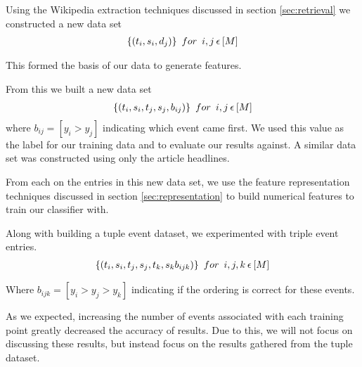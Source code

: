 \documentclass[bsc,frontabs,twoside,singlespacing,parskip,deptreport]{infthesis}     %
\begin{document}
    Using the Wikipedia extraction techniques discussed in section \ref{sec:retrieval} we constructed a new data set
    \begin{eqnarray}
      \{(t_{i},s_{i},d_{j})\} \hspace{0.5em} for \hspace{0.5em}i,j  \hspace{0.2em}\epsilon \hspace{0.2em}[M]\nonumber
    \end{eqnarray}
    
    This formed the basis of our data to generate features.

    From this we built a new data set
    \begin{eqnarray}
      \{(t_{i},s_{i},t_{j},s_{j},b_{ij})\} \hspace{0.5em} for \hspace{0.5em} i,j \hspace{0.2em}\epsilon \hspace{0.2em}[M]\nonumber
    \end{eqnarray}
    where $b_{ij} = [y_{i} > y_{j}]$ indicating which event came first.
    We used this value as the label for our training data and to evaluate our results against.
    A similar data set was constructed using only the article headlines.
    
    From each on the entries in this new data set, we use the feature representation techniques discussed in section \ref{sec:representation} to build numerical
    features to train our classifier with.

Along with building a tuple event dataset, we experimented with triple event entries.
\begin{eqnarray}
      \{(t_{i},s_{i},t_{j},s_{j},t_{k},s_{k}b_{ijk})\} \hspace{0.5em} for \hspace{0.5em} i,j,k \hspace{0.2em}\epsilon \hspace{0.2em}[M]\nonumber
\end{eqnarray}

Where $b_{ijk} = [y_i > y_j > y_k]$ indicating if the ordering is correct for these events.


As we expected, increasing the number of events associated with each training point greatly decreased the accuracy of results.
Due to this, we will not focus on discussing these results, but instead focus on the results gathered from the tuple dataset.
\end{document}
